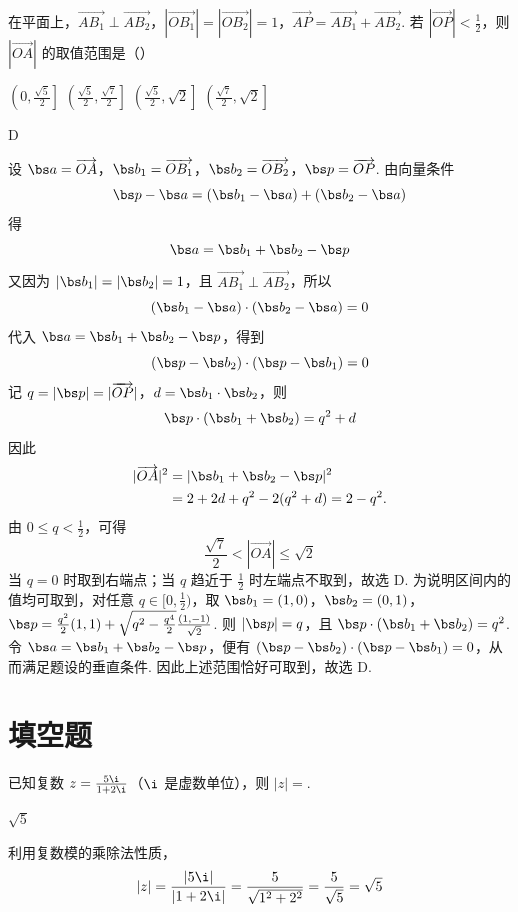 \begin{problem}
在平面上，\(\overrightarrow{AB_1} \perp \overrightarrow{AB_2}\)，\(|\overrightarrow{OB_1}| = |\overrightarrow{OB_2}| = 1\)，\(\overrightarrow{AP} = \overrightarrow{AB_1} + \overrightarrow{AB_2}\). 若 \(|\overrightarrow{OP}| < \frac{1}{2}\)，则 \(|\overrightarrow{OA}|\) 的取值范围是（\quad）

\choices
    {\(\left(0, \frac{\sqrt{5}}{2}\right]\)}
    {\(\left(\frac{\sqrt{5}}{2}, \frac{\sqrt{7}}{2}\right]\)}
    {\(\left(\frac{\sqrt{5}}{2}, \sqrt{2}\right]\)}
    {\(\left(\frac{\sqrt{7}}{2}, \sqrt{2}\right]\)}

\begin{answer}
D
\end{answer}

\begin{solution}
设
\(\bs a=\overrightarrow{OA}\)，\(\bs b_1=\overrightarrow{OB_1}\)，\(\bs b_2=\overrightarrow{OB_2}\)，\(\bs p=\overrightarrow{OP}\).
由向量条件
\[
\bs p-\bs a=(\bs b_1-\bs a)+(\bs b_2-\bs a)
\]
得
\[
\bs a=\bs b_1+\bs b_2-\bs p
\]
又因为 \(|\bs b_1|=|\bs b_2|=1\)，且 \(\overrightarrow{AB_1}\perp\overrightarrow{AB_2}\)，所以
\[
(\bs b_1-\bs a)\cdot(\bs b_2-\bs a)=0
\]
代入 \(\bs a=\bs b_1+\bs b_2-\bs p\)，得到
\[
(\bs p-\bs b_2)\cdot(\bs p-\bs b_1)=0
\]
记 \(q=|\bs p|=|\overrightarrow{OP}|\)，\(d=\bs b_1\cdot\bs b_2\)，则
\[
\bs p\cdot(\bs b_1+\bs b_2)=q^2+d
\]
因此
\[
\begin{aligned}
|\overrightarrow{OA}|^2
&=|\bs b_1+\bs b_2-\bs p|^2\\
&=2+2d+q^2-2(q^2+d)=2-q^2.
\end{aligned}
\]
由 \(0\leqslant q<\frac12\)，可得
\[
\frac{\sqrt7}{2}<|\overrightarrow{OA}|\leqslant\sqrt2
\]
当 \(q=0\) 时取到右端点；当 \(q\) 趋近于 \(\frac12\) 时左端点不取到，故选 D.
为说明区间内的值均可取到，对任意 \(q\in[0,\frac12)\)，取
\(\bs b_1=(1,0)\)，\(\bs b_2=(0,1)\)，\(\bs p=\frac{q^2}{2}(1,1)+\sqrt{q^2-\frac{q^4}{2}}\frac{(1,-1)}{\sqrt2}\).
则 \(|\bs p|=q\)，且 \(\bs p\cdot(\bs b_1+\bs b_2)=q^2\). 令
\(\bs a=\bs b_1+\bs b_2-\bs p\)，便有
\((\bs p-\bs b_2)\cdot(\bs p-\bs b_1)=0\)，从而满足题设的垂直条件. 因此上述范围恰好可取到，故选 D.
\end{solution}
\end{problem}

\section{填空题}

\begin{problem}
已知复数 \( z = \frac{5\i}{1 + 2\i} \)（\(\i\) 是虚数单位），则 \( |z| = \)\fillinblank{}.

\begin{answer}
\(\sqrt{5}\)
\end{answer}

\begin{solution}
利用复数模的乘除法性质，
\[
|z|=\frac{|5\i|}{|1+2\i|}=\frac{5}{\sqrt{1^2+2^2}}=\frac{5}{\sqrt5}=\sqrt5
\]
\end{solution}
\end{problem}

